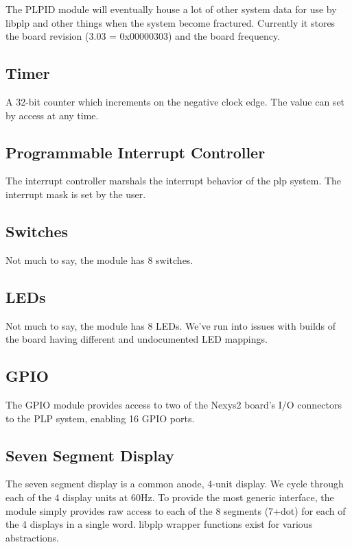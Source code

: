 \documentclass{article}
\begin{document}
The PLPID module will eventually house a lot of other system data for use by libplp and other things when the system become fractured. Currently it stores the board revision (3.03 = 0x00000303) and the board frequency.

\subsection{Timer}

A 32-bit counter which increments on the negative clock edge. The value can set by access at any time.

\subsection{Programmable Interrupt Controller}

The interrupt controller marshals the interrupt behavior of the plp system. The interrupt mask is set by the user.

\subsection{Switches}
Not much to say, the module has 8 switches.

\subsection{LEDs}
Not much to say, the module has 8 LEDs. We've run into issues with builds of the board having different and undocumented LED mappings.

\subsection{GPIO}
The GPIO module provides access to two of the Nexys2 board's I/O connectors to the PLP system, enabling 16 GPIO ports.

\subsection{Seven Segment Display}
The seven segment display is a common anode, 4-unit display. We cycle through each of the 4 display units at 60Hz. To provide the most generic interface, the module simply provides raw access to each of the 8 segments (7+dot) for each of the 4 displays in a single word. libplp wrapper functions exist for various abstractions.
\end{document}
